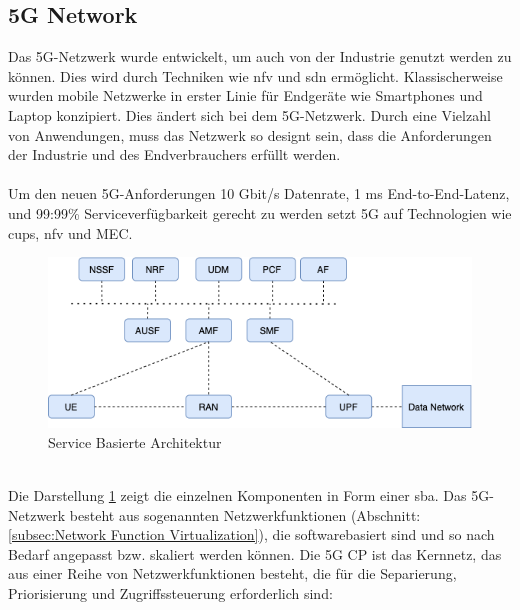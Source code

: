 \documentclass[runningheads]{llncs}
\numberwithin{figure}{section}
\begin{document}
\subsection{5G Network}
\label{subsec:5G Network}
Das 5G-Netzwerk wurde entwickelt, um auch von der Industrie genutzt werden zu können.
Dies wird durch Techniken wie \acrlong{nfv} und \acrlong{sdn} ermöglicht. \cite{BARAKABITZE2020106984}
Klassischerweise wurden mobile Netzwerke in erster Linie für Endgeräte wie Smartphones und Laptop konzipiert. 
Dies ändert sich bei dem 5G-Netzwerk. Durch eine Vielzahl von Anwendungen,
muss das Netzwerk so designt sein, dass die Anforderungen der Industrie und des Endverbrauchers erfüllt werden.
\\
\\
Um den neuen 5G-Anforderungen 10 Gbit/s Datenrate, 1 ms End-to-End-Latenz, und 99:99\% 
Serviceverfügbarkeit gerecht zu werden setzt 5G auf Technologien wie \acrfull{cups}, \acrfull{nfv} und MEC.
\begin{figure}
  \includegraphics[width=\linewidth]{images/ServiceBased5g.png}
  \caption{Service Basierte Architektur}
  \label{fig:ServiceBased5g}
\end{figure}
\\
Die Darstellung \ref{fig:ServiceBased5g} zeigt die einzelnen Komponenten in Form einer \acrfull{sba}. \cite{5GCoreNetwork2017}
Das 5G-Netzwerk besteht aus sogenannten Netzwerkfunktionen (Abschnitt: \ref{subsec:Network Function Virtualization}), 
die softwarebasiert sind und so nach Bedarf angepasst bzw. skaliert werden können.
Die 5G CP ist das Kernnetz, das aus einer Reihe von Netzwerkfunktionen besteht, 
die für die Separierung, Priorisierung und Zugriffssteuerung erforderlich sind:
\end{document}

